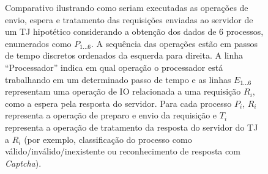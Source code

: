 \begin{figure}[H]

    \caption{%
        Comparativo ilustrando como seriam executadas as operações de envio,
        espera e tratamento das requisições enviadas ao servidor de um TJ
        hipotético considerando a obtenção dos dados de 6 processos, enumerados
        como $P_{1...6}$. A sequência das operações estão em passos de tempo
        discretos ordenados da esquerda para direita. A linha ``Processador''
        indica em qual operação o processador está trabalhando em um
        determinado passo de tempo e as linhas $E_{1...6}$ representam uma
        operação de IO relacionada a uma requisição $R_i$, como a espera pela
        resposta do servidor.
        Para cada processo $P_i$, $R_i$ representa a operação de preparo e
        envio da requisição e $T_i$ representa a operação de tratamento da
        resposta do servidor do TJ a $R_i$ (por exemplo, classificação do
        processo como válido/inválido/inexistente ou reconhecimento de resposta
        com \textit{Captcha}).
    }
    \label{gra:modelo-temporização-requisições}
\end{figure}


